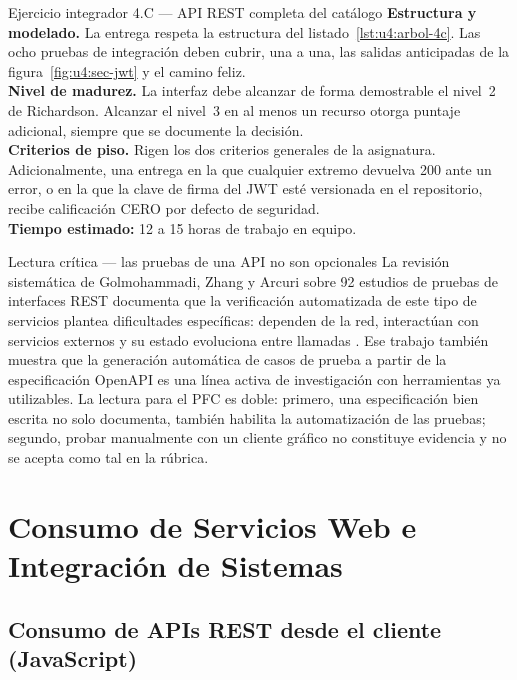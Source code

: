 \documentclass[11pt,a4paper,openany]{book}
\begin{document}
\begin{cajaejercicio}{Ejercicio integrador 4.C --- API REST completa del catálogo}
	\textbf{Estructura y modelado.} La entrega respeta la estructura del listado~\ref{lst:u4:arbol-4c}. Las ocho pruebas de integración deben cubrir, una a una, las salidas anticipadas de la figura~\ref{fig:u4:sec-jwt} y el camino feliz.\\[4pt]
	\textbf{Nivel de madurez.} La interfaz debe alcanzar de forma demostrable el nivel~2 de Richardson. Alcanzar el nivel~3 en al menos un recurso otorga puntaje adicional, siempre que se documente la decisión.\\[4pt]
	\textbf{Criterios de piso.} Rigen los dos criterios generales de la asignatura. Adicionalmente, una entrega en la que cualquier extremo devuelva 200 ante un error, o en la que la clave de firma del JWT esté versionada en el repositorio, recibe calificación CERO por defecto de seguridad.\\[4pt]
	\textbf{Tiempo estimado:} 12 a 15 horas de trabajo en equipo.
\end{cajaejercicio}

\begin{cajacritica}{Lectura crítica --- las pruebas de una API no son opcionales}
	La revisión sistemática de Golmohammadi, Zhang y Arcuri sobre 92 estudios de pruebas de interfaces REST documenta que la verificación automatizada de este tipo de servicios plantea dificultades específicas: dependen de la red, interactúan con servicios externos y su estado evoluciona entre llamadas \cite{golmohammadi2023testing}. Ese trabajo también muestra que la generación automática de casos de prueba a partir de la especificación OpenAPI es una línea activa de investigación con herramientas ya utilizables. La lectura para el PFC es doble: primero, una especificación bien escrita no solo documenta, también habilita la automatización de las pruebas; segundo, probar manualmente con un cliente gráfico no constituye evidencia y no se acepta como tal en la rúbrica.
\end{cajacritica}

\section{Consumo de Servicios Web e Integración de Sistemas}
\label{sec:u4:consumo}

\subsection{Consumo de APIs REST desde el cliente (JavaScript)}
\label{sec:u4:cliente}
\end{document}
